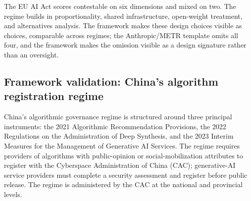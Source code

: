 The EU AI Act scores contestable on six dimensions and mixed on two. The regime builds in proportionality, shared infrastructure, open-weight treatment, and alternatives analysis. The framework makes these design choices visible as choices, comparable across regimes; the Anthropic/METR template omits all four, and the framework makes the omission visible as a design signature rather than an oversight.

\subsection{Framework validation: China's algorithm registration regime}

China's algorithmic governance regime is structured around three principal instruments: the 2021 Algorithmic Recommendation Provisions, the 2022 Regulations on the Administration of Deep Synthesis, and the 2023 Interim Measures for the Management of Generative AI Services. The regime requires providers of algorithms with public-opinion or social-mobilization attributes to register with the Cyberspace Administration of China (CAC); generative-AI service providers must complete a security assessment and register before public release. The regime is administered by the CAC at the national and provincial levels.

